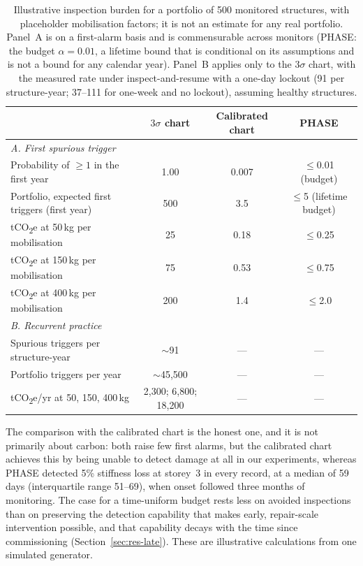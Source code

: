\documentclass[12pt,a4paper]{article}
\newcommand{\rev}[1]{#1}
\newenvironment{revblock}{}{}
\newcommand{\rev}[1]{{\color{revcol}#1}}
\newenvironment{revblock}{\begingroup\color{revcol}}{\endgroup}
\begin{document}
\begin{table}[t]
\centering
\small
\begin{revblock}
\caption{Illustrative inspection burden for a portfolio of 500 monitored structures, with placeholder mobilisation factors; it is not an estimate for any real portfolio. Panel~A is on a first-alarm basis and is commensurable across monitors (PHASE: the budget $\alpha=0.01$, a lifetime bound that is conditional on its assumptions and is not a bound for any calendar year). Panel~B applies only to the $3\sigma$ chart, with the measured rate under inspect-and-resume with a one-day lockout (91 per structure-year; 37--111 for one-week and no lockout), assuming healthy structures.}
\label{tab:carbon}
\begin{tabular}{lccc}
\toprule
& $3\sigma$ chart & Calibrated chart & PHASE \\
\midrule
\multicolumn{4}{l}{\textit{A. First spurious trigger}}\\
Probability of $\ge1$ in the first year & 1.00 & 0.007 & $\le$0.01 (budget) \\
Portfolio, expected first triggers (first year) & 500 & 3.5 & $\le$5 (lifetime budget) \\
tCO\textsubscript{2}e at 50\,kg per mobilisation & 25 & 0.18 & $\le$0.25 \\
tCO\textsubscript{2}e at 150\,kg per mobilisation & 75 & 0.53 & $\le$0.75 \\
tCO\textsubscript{2}e at 400\,kg per mobilisation & 200 & 1.4 & $\le$2.0 \\
\midrule
\multicolumn{4}{l}{\textit{B. Recurrent practice}}\\
Spurious triggers per structure-year & $\sim$91 & --- & --- \\
Portfolio triggers per year & $\sim$45{,}500 & --- & --- \\
tCO\textsubscript{2}e/yr at 50, 150, 400\,kg & 2{,}300; 6{,}800; 18{,}200 & --- & --- \\
\bottomrule
\end{tabular}
\end{revblock}
\end{table}

The comparison with the calibrated chart is the honest one, and it is not primarily about carbon: both raise few first alarms, but the calibrated chart achieves this by being unable to detect damage at all in our experiments, whereas PHASE detected 5\% stiffness loss at storey~3 in every record, at a median of 59 days \rev{(interquartile range 51--69), when onset followed three months of monitoring}. The case for a time-uniform budget rests less on avoided inspections than on preserving the detection capability that makes early, repair-scale intervention possible, \rev{and that capability decays with the time since commissioning (Section~\ref{sec:res-late})}. \rev{These are illustrative calculations from one simulated generator.}
\end{document}
